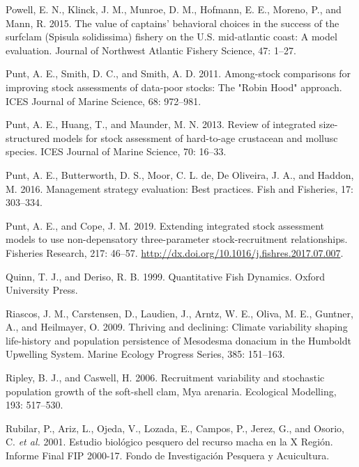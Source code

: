 \documentclass[12pt]{article}
\begin{document}
\leavevmode\hypertarget{ref-Powell2015}{}%
Powell, E. N., Klinck, J. M., Munroe, D. M., Hofmann, E. E., Moreno, P.,
and Mann, R. 2015. The value of captains' behavioral choices in the
success of the surfclam (Spisula solidissima) fishery on the U.S.
mid-atlantic coast: A model evaluation. Journal of Northwest Atlantic
Fishery Science, 47: 1--27.

\leavevmode\hypertarget{ref-Punt2011}{}%
Punt, A. E., Smith, D. C., and Smith, A. D. 2011. Among-stock
comparisons for improving stock assessments of data-poor stocks: The
"Robin Hood" approach. ICES Journal of Marine Science, 68: 972--981.

\leavevmode\hypertarget{ref-Punt2013}{}%
Punt, A. E., Huang, T., and Maunder, M. N. 2013. Review of integrated
size-structured models for stock assessment of hard-to-age crustacean
and mollusc species. ICES Journal of Marine Science, 70: 16--33.

\leavevmode\hypertarget{ref-Punt2016}{}%
Punt, A. E., Butterworth, D. S., Moor, C. L. de, De Oliveira, J. A., and
Haddon, M. 2016. Management strategy evaluation: Best practices. Fish
and Fisheries, 17: 303--334.

\leavevmode\hypertarget{ref-Punt2019}{}%
Punt, A. E., and Cope, J. M. 2019. Extending integrated stock assessment
models to use non-depensatory three-parameter stock-recruitment
relationships. Fisheries Research, 217: 46--57.
\url{http://dx.doi.org/10.1016/j.fishres.2017.07.007}.

\leavevmode\hypertarget{ref-Quinn1999}{}%
Quinn, T. J., and Deriso, R. B. 1999. Quantitative Fish Dynamics. Oxford
University Press.

\leavevmode\hypertarget{ref-Riascos2009}{}%
Riascos, J. M., Carstensen, D., Laudien, J., Arntz, W. E., Oliva, M. E.,
Guntner, A., and Heilmayer, O. 2009. Thriving and declining: Climate
variability shaping life-history and population persistence of Mesodesma
donacium in the Humboldt Upwelling System. Marine Ecology Progress
Series, 385: 151--163.

\leavevmode\hypertarget{ref-Ripley2006}{}%
Ripley, B. J., and Caswell, H. 2006. Recruitment variability and
stochastic population growth of the soft-shell clam, Mya arenaria.
Ecological Modelling, 193: 517--530.

\leavevmode\hypertarget{ref-Rubilar2001}{}%
Rubilar, P., Ariz, L., Ojeda, V., Lozada, E., Campos, P., Jerez, G., and
Osorio, C. \emph{et al.} 2001. Estudio biológico pesquero del recurso
macha en la X Región. Informe Final FIP 2000-17. Fondo de Investigación
Pesquera y Acuicultura.
\end{document}
